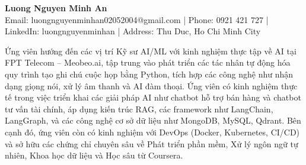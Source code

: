 \documentclass[a4paper,11pt]{article}
\newcommand{\sectiontitle}[1]{\vspace{0.5em}\noindent{\Large\color{primary}\textbf{#1}}\vspace{0.2em}}
\begin{document}
\pagestyle{empty}

\begin{center}
    {\Huge \color{text} \textbf{Luong Nguyen Minh An}} \\
    \vspace{0.2em}
    \small
    \color{text}
    Email: luongnguyenminhan02052004@gmail.com | Phone: 0921 421 727 | LinkedIn: luongnguyenminhan | Address: Thu Duc, Ho Chi Minh City
\end{center}

\vspace{0.5em}

\sectiontitle{Summary}
\noindent Ứng vi\^{e}n hướng đến c\'{a}c vị tr\'{i} Kỹ sư AI/ML với kinh nghiệm thực tập về AI tại FPT Telecom -- Meobeo.ai, tập trung v\`{a}o ph\'{a}t triển c\'{a}c t\'{a}c nh\^{a}n tự động h\'{o}a quy tr\`{i}nh tạo ghi ch\'{u} cuộc họp bằng Python, t\'{i}ch hợp c\'{a}c c\^{o}ng nghệ như nhận dạng giọng n\'{o}i, xử lý \^{a}m thanh v\`{a} AI đ\`{a}m thoại. Ứng vi\^{e}n c\'{o} kinh nghiệm thực tế trong việc triển khai c\'{a}c giải ph\'{a}p AI như chatbot hỗ trợ b\'{a}n h\`{a}ng v\`{a} chatbot tư vấn t\`{a}i ch\'{i}nh, \'{a}p dụng kiến tr\'{u}c RAG, c\'{a}c framework như LangChain, LangGraph, v\`{a} c\'{a}c c\^{o}ng nghệ cơ sở dữ liệu như MongoDB, MySQL, Qdrant. B\^{e}n cạnh đ\'{o}, ứng vi\^{e}n c\`{o}n c\'{o} kinh nghiệm với DevOps (Docker, Kubernetes, CI/CD) v\`{a} sở hữu c\'{a}c chứng chỉ chuy\^{e}n s\^{a}u về Ph\'{a}t triển phần mềm, Xử lý ng\^{o}n ngữ tự nhi\^{e}n, Khoa học dữ liệu v\`{a} Học s\^{a}u từ Coursera.

\vspace{0.5em}
\end{document}
